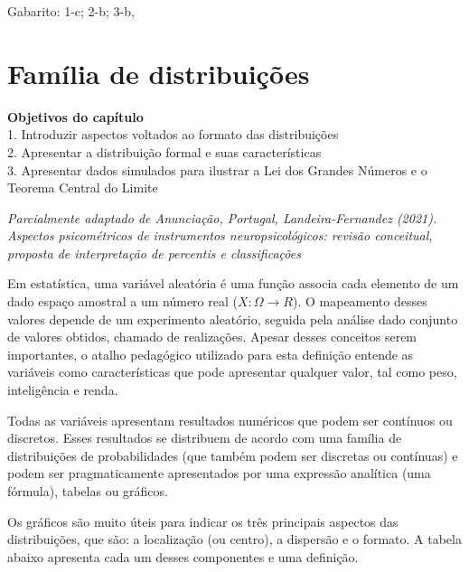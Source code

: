 \documentclass[
]{book}
\begin{document}
\begin{mirror}

Gabarito: 1-c; 2-b; 3-b,

\end{mirror}

\hypertarget{famuxedlia-de-distribuiuxe7uxf5es}{%
\chapter{Família de
distribuições}\label{famuxedlia-de-distribuiuxe7uxf5es}}

\begin{objectives}
\textbf{Objetivos do capítulo}\\
1. Introduzir aspectos voltados ao formato das distribuições\\
2. Apresentar a distribuição formal e suas características\\
3. Apresentar dados simulados para ilustrar a Lei dos Grandes Números e
o Teorema Central do Limite
\end{objectives}

\emph{Parcialmente adaptado de Anunciação, Portugal, Landeira-Fernandez
(2021). Aspectos psicométricos de instrumentos neuropsicológicos:
revisão conceitual, proposta de interpretação de percentis e
classificações }

Em estatística, uma variável aleatória é uma função associa cada
elemento de um dado espaço amostral a um número real
(\(X:\Omega \rightarrow R\)). O mapeamento desses valores depende de um
experimento aleatório, seguida pela análise dado conjunto de valores
obtidos, chamado de realizações. Apesar desses conceitos serem
importantes, o atalho pedagógico utilizado para esta definição entende
as variáveis como características que pode apresentar qualquer valor,
tal como peso, inteligência e renda.

Todas as variáveis apresentam resultados numéricos que podem ser
contínuos ou discretos. Esses resultados se distribuem de acordo com uma
família de distribuições de probabilidades (que também podem ser
discretas ou contínuas) e podem ser pragmaticamente apresentados por uma
expressão analítica (uma fórmula), tabelas ou gráficos.

Os gráficos são muito úteis para indicar os três principais aspectos das
distribuições, que são: a localização (ou centro), a dispersão e o
formato. A tabela abaixo apresenta cada um desses componentes e uma
definição.
\end{document}
